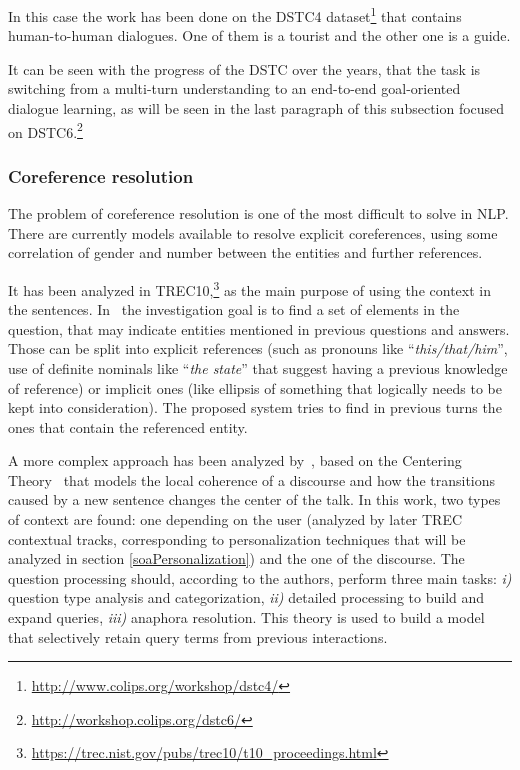 In this case the work has been done on the DSTC4 dataset\footnote{\url{http://www.colips.org/workshop/dstc4/}} that contains human-to-human dialogues. One of them is a tourist and the other one is a guide.

It can be seen with the progress of the DSTC over the years, that the task is switching from a multi-turn understanding to an end-to-end goal-oriented dialogue learning, as will be seen in the last paragraph of this subsection focused on DSTC6.\footnote{\url{http://workshop.colips.org/dstc6/}}

\subsubsection{Coreference resolution}
\label{soaCoreference}

The problem of coreference resolution is one of the most difficult to solve in NLP. There are currently models available to resolve explicit coreferences, using some correlation of gender and number between the entities and further references.

It has been analyzed in TREC10,\footnote{\url{https://trec.nist.gov/pubs/trec10/t10\_proceedings.html}} as the main purpose of using the context in the sentences. In~\cite{harabagiu2001answering} the investigation goal is to find a set of elements in the question, that may indicate entities mentioned in previous questions and answers. Those can be split into explicit references (such as pronouns like ``\textit{this/that/him}'', use of definite nominals like ``\textit{the state}'' that suggest having a previous knowledge of reference) or implicit ones (like ellipsis of something that logically needs to be kept into consideration). The proposed system tries to find in previous turns the ones that contain the referenced entity.

A more complex approach has been analyzed by~\cite{sun2007discourse}, based on the Centering Theory~\cite{grosz1995centering} that models the local coherence of a discourse and how the transitions caused by a new sentence changes the center of the talk. In this work, two types of context are found: one depending on the user (analyzed by later TREC contextual tracks, corresponding to personalization techniques that will be analyzed in section \ref{soaPersonalization}) and the one of the discourse. The question processing should, according to the authors, perform three main tasks: \textit{i)} question type analysis and categorization, \textit{ii)} detailed processing to build and expand queries, \textit{iii)} anaphora resolution. This theory is used to build a model that selectively retain query terms from previous interactions.

